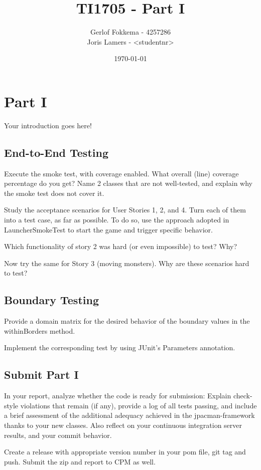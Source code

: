 \documentclass[a4paper]{article}
\title{TI1705 - Part I}
\author{Gerlof Fokkema - 4257286\\
		Joris Lamers - \textless studentnr\textgreater}
\date{\today}
\begin{document}
  \maketitle
  \section{Part I}
    Your introduction goes here!
      
  \subsection{End-to-End Testing}
    \thm Execute the smoke test, with coverage enabled. What overall (line) coverage percentage do you get? Name 2 classes that are not well-tested, and explain why the smoke test does not cover it.

    \thm Study the acceptance scenarios for User Stories 1, 2, and 4. Turn each of them into a test case, as far as possible. To do so, use the approach adopted in LauncherSmokeTest to start the game and trigger specific behavior.
    
    \thm Which functionality of story 2 was hard (or even impossible) to test? Why?
    
    \thm Now try the same for Story 3 (moving monsters). Why are these scenarios hard to test?
  
  \subsection{Boundary Testing}
    \thm Provide a domain matrix for the desired behavior of the boundary values in the withinBorders method.

    \thm Implement the corresponding test by using JUnit’s Parameters annotation.
  
  \subsection{Submit Part I}
    \thm In your report, analyze whether the code is ready for submission: Explain check-style violations that remain (if any), provide a log of all tests passing, and include a brief assessment of the additional adequacy achieved in the jpacman-framework thanks to your new classes. Also reflect on your continuous integration server results, and your commit behavior.
    
    \thm Create a release with appropriate version number in your pom file, git tag and push. Submit the zip and report to CPM as well.
\end{document}
